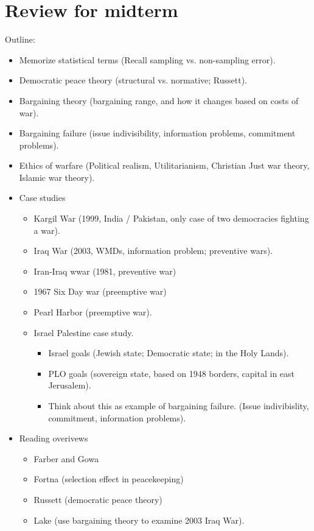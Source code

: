 \documentclass{article}
\begin{document}
\section{Review for midterm}

  Outline:
  \begin{itemize}
    \item Memorize statistical terms (Recall sampling vs. non-sampling error).
    \item Democratic peace theory (structural vs. normative; Russett).
    \item Bargaining theory (bargaining range, and how it changes based on costs of war).
    \item Bargaining failure (issue indivisibility, information problems, commitment problems).
    \item Ethics of warfare (Political realism, Utilitarianism, Christian Just war theory, Islamic war theory).
    \item Case studies
      \begin{itemize}
        \item Kargil War (1999, India / Pakistan, only case of two democracies fighting a war).
        \item Iraq War (2003, WMDs, information problem; preventive wars).
        \item Iran-Iraq wwar (1981, preventive war)
        \item 1967 Six Day war (preemptive war)
        \item Pearl Harbor (preemptive war).
        \item Israel Palestine case study.
          \begin{itemize}
            \item Israel goals (Jewish state; Democratic state; in the Holy Lands).
            \item PLO goals (sovereign state, based on 1948 borders, capital in east Jerusalem).
            \item Think about this as example of bargaining failure.  (Issue indivibislity, commitment, information problems).
          \end{itemize}
      \end{itemize}
    \item Reading overivews
      \begin{itemize}
        \item Farber and Gowa
        \item Fortna (selection effect in peacekeeping)
        \item Russett (democratic peace theory)
        \item Lake (use bargaining theory to examine 2003 Iraq War).
      \end{itemize}
  \end{itemize}
\end{document}
